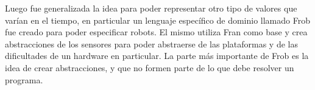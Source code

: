 
Luego fue generalizada la idea para poder representar otro tipo de
valores que varían en el tiempo, en particular un lenguaje específico
de dominio llamado
Frob \cite{petersonhudakelliot99:lambdainmotion} fue creado para
poder especificar
robots.
El mismo utiliza Fran como base y crea abstracciones de los sensores
para poder abstraerse de las plataformas y de las dificultades de un hardware en particular.
  La parte más importante de Frob es la idea de crear abstracciones, y que no formen
parte de lo que debe resolver un programa.


